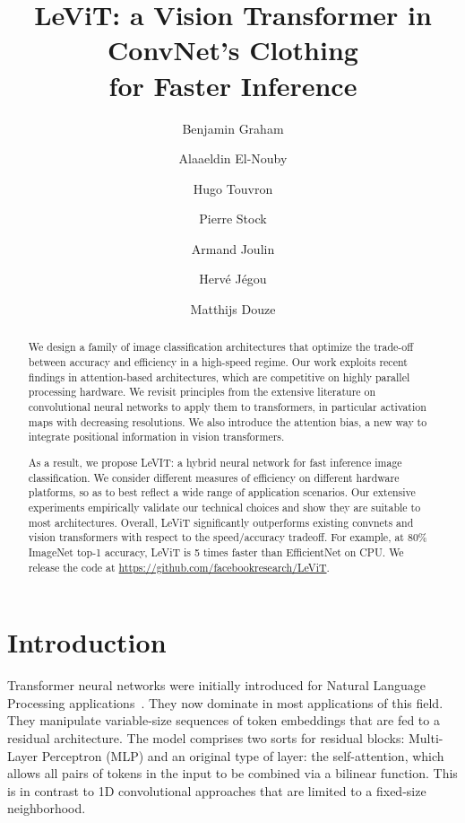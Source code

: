 \documentclass[10pt,twocolumn,letterpaper]{article}
\date{}
\begin{document}
\title{LeViT: a Vision Transformer in ConvNet's Clothing \\ for Faster Inference}

\author{
Benjamin Graham \and
Alaaeldin El-Nouby \and
Hugo Touvron \and
Pierre Stock  \and 
Armand Joulin \and
Herv\'e J\'egou \and
Matthijs Douze
}

\maketitle



\begin{abstract}
We design a family of image classification architectures that optimize the trade-off between accuracy and efficiency in a high-speed regime. 
Our work exploits recent findings in attention-based architectures, which are competitive on highly parallel processing hardware. We revisit principles from the extensive literature on convolutional neural networks to apply them to transformers, in particular activation maps with decreasing resolutions. 
We also introduce the attention bias, a new way to integrate positional information in vision transformers.

As a result, we propose LeVIT: a hybrid neural network for fast inference image classification. 
We consider different measures of efficiency on different hardware platforms, so as to best reflect a wide range of application scenarios. 
Our extensive experiments empirically validate our technical choices and show they are suitable to most architectures. Overall, LeViT significantly outperforms existing convnets and vision transformers with respect to the speed/accuracy tradeoff.
For example, at 80\% ImageNet top-1 accuracy, LeViT is 5 times faster than EfficientNet on CPU. We release the code at \url{https://github.com/facebookresearch/LeViT}.
\end{abstract}



\vspace{-10pt}
\section{Introduction}
\label{sec:introduction}

Transformer neural networks were initially introduced for Natural Language Processing applications~\cite{Vaswani2017AttentionIA}. They now dominate in most applications of this field. 
They manipulate variable-size sequences of token embeddings that are fed to a residual architecture. 
The model comprises two sorts for residual blocks: Multi-Layer Perceptron (MLP) and an original type of layer: the self-attention, which allows all pairs of tokens in the input to be combined via a bilinear function. 
This is in contrast to 1D convolutional approaches that are limited to a fixed-size neighborhood.
\end{document}
